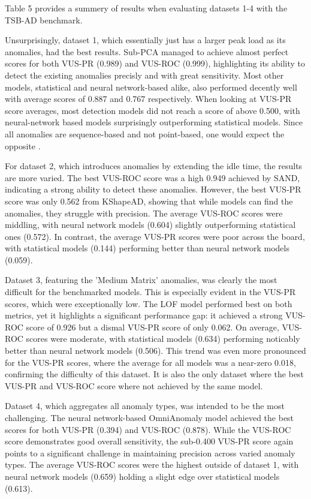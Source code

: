 \documentclass[12pt,oneside]{article}
\begin{document}
Table 5 provides a summery of results when evaluating datasets 1-4 with the TSB-AD benchmark. \par Unsurprisingly, dataset 1, which essentially just has a larger peak load as its anomalies, had the best results. Sub-PCA managed to achieve almost perfect scores for both VUS-PR (0.989) and VUS-ROC (0.999), highlighting its ability to detect the existing anomalies precisly and with great sensitivity. Most other models, statistical and neural network-based alike, also performed decently well with average scores of 0.887 and 0.767 respectively.
When looking at VUS-PR score averages, most detection models did not reach a score of above 0.500, with neural-network based models surprisingly outperforming statistical models. Since all anomalies are sequence-based and not point-based, one would expect the opposite \parencites[p.~10]{liu2024elephant}[p.~1706]{paparrizos2022tsb}. \par
For dataset 2, which introduces anomalies by extending the idle time, the results are more varied. The best VUS-ROC score was a high 0.949 achieved by SAND, indicating a strong ability to detect these anomalies. However, the best VUS-PR score was only 0.562 from KShapeAD, showing that while models can find the anomalies, they struggle with precision. The average VUS-ROC scores were middling, with neural network models (0.604) slightly outperforming statistical ones (0.572). In contrast, the average VUS-PR scores were poor across the board, with statistical models (0.144) performing better than neural network models (0.059). \par
Dataset 3, featuring the 'Medium Matrix' anomalies, was clearly the most difficult for the benchmarked models. This is especially evident in the VUS-PR scores, which were exceptionally low. The LOF model performed best on both metrics, yet it highlights a significant performance gap: it achieved a strong VUS-ROC score of 0.926 but a dismal VUS-PR score of only 0.062. On average, VUS-ROC scores were moderate, with statistical models (0.634) performing noticably better than neural network models (0.506). This trend was even more pronounced for the VUS-PR scores, where the average for all models was a near-zero 0.018, confirming the difficulty of this dataset. It is also the only dataset where the best VUS-PR and VUS-ROC score where not achieved by the same model. \par
Dataset 4, which aggregates all anomaly types, was intended to be the most challenging. The neural network-based OmniAnomaly model achieved the best scores for both VUS-PR (0.394) and VUS-ROC (0.878). While the VUS-ROC score demonstrates good overall sensitivity, the sub-0.400 VUS-PR score again points to a significant challenge in maintaining precision across varied anomaly types. The average VUS-ROC scores were the highest outside of dataset 1, with neural network models (0.659) holding a slight edge over statistical models (0.613). \par
\end{document}
